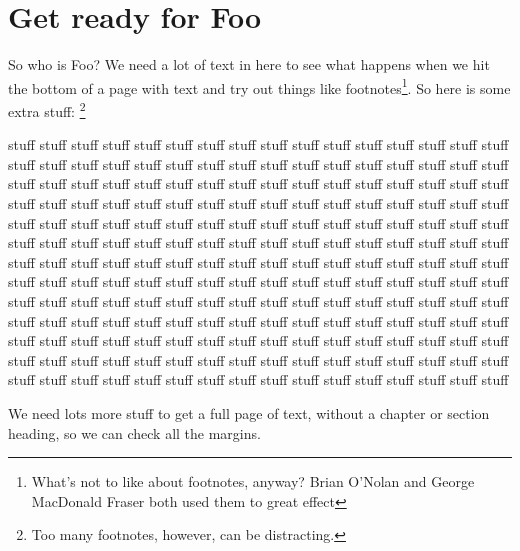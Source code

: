 \documentclass[proposal]{bsu-ms}
\begin{document}
\label{ch:intro}

\section{Get ready for Foo}\label{sec:getReady}

So who is Foo? We need a lot of text in here to see what happens when
we hit the bottom of a page with text and try out things like
footnotes\footnote{What's not to like about footnotes, anyway?  Brian
  O'Nolan and George MacDonald Fraser both used them to great effect}.
So here is some extra stuff:%
\footnote{Too many footnotes, however, can be distracting.}

stuff stuff stuff stuff stuff stuff stuff stuff stuff stuff stuff stuff stuff
stuff stuff stuff stuff stuff stuff stuff stuff stuff stuff stuff stuff stuff
stuff stuff stuff stuff stuff stuff stuff stuff stuff stuff stuff stuff stuff
stuff stuff stuff stuff stuff stuff stuff stuff stuff stuff stuff stuff stuff
stuff stuff stuff stuff stuff stuff stuff stuff stuff stuff stuff stuff stuff
stuff stuff stuff stuff stuff stuff stuff stuff stuff stuff stuff stuff stuff
stuff stuff stuff stuff stuff stuff stuff stuff stuff stuff stuff stuff stuff
stuff stuff stuff stuff stuff stuff stuff stuff stuff stuff stuff stuff stuff
stuff stuff stuff stuff stuff stuff stuff stuff stuff stuff stuff stuff stuff
stuff stuff stuff stuff stuff stuff stuff stuff stuff stuff stuff stuff stuff
stuff stuff stuff stuff stuff stuff stuff stuff stuff stuff stuff stuff stuff
stuff stuff stuff stuff stuff stuff stuff stuff stuff stuff stuff stuff stuff
stuff stuff stuff stuff stuff stuff stuff stuff stuff stuff stuff stuff stuff
stuff stuff stuff stuff stuff stuff stuff stuff stuff stuff stuff stuff stuff
stuff stuff stuff stuff stuff stuff stuff stuff stuff stuff stuff stuff stuff
stuff stuff stuff stuff stuff stuff stuff stuff stuff stuff stuff stuff stuff

We need lots more stuff to get a full page of text, without a chapter
or section heading, so we can check all the margins.
\end{document}
